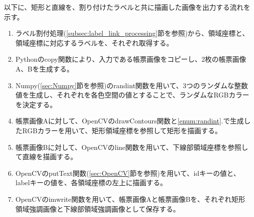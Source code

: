 以下に、矩形と直線を、割り付けたラベルと共に描画した画像を出力する流れを示す。

\begin{enumerate}
    \item ラベル割付処理(\ref{subsec:label_link_processing}節を参照)から、領域座標と、領域座標に対応するラベルを、それぞれ取得する。
    \item Pythonのcopy関数により、入力である帳票画像をコピーし、2枚の帳票画像A、Bを生成する。
    \item \label{enum:randint}Numpy(\ref{sec:Numpy}節を参照)のrandint関数を用いて、3つのランダムな整数値を生成し、それぞれを各色空間の値とすることで、ランダムなRGBカラーを決定する。
    \item 帳票画像Aに対して、OpenCVのdrawContours関数と\ref{enum:randint}.で生成したRGBカラーを用いて、矩形領域座標を参照して矩形を描画する。
    \item 帳票画像Bに対して、OpenCVのline関数を用いて、下線部領域座標を参照して直線を描画する。
    \item OpenCVのputText関数(\ref{sec:OpenCV}節を参照)を用いて、idキーの値と、labelキーの値を、各領域座標の左上に描画する。
    \item OpenCVのimwrite関数を用いて、帳票画像Aと帳票画像Bを、それぞれ矩形領域強調画像と下線部領域強調画像として保存する。
\end{enumerate}

